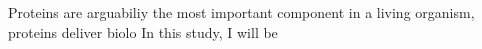 Proteins are arguabiliy the most important component in a living organism, proteins deliver biolo   In this study, I will be 